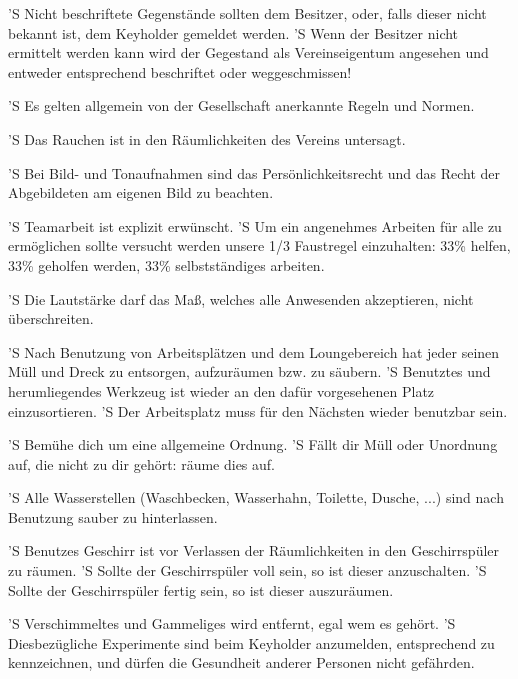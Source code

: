 \documentclass[a4paper,8pt]{scrreprt}
\begin{document}
\begin{contract}
'S Nicht beschriftete Gegenstände sollten dem Besitzer, oder, falls dieser
nicht bekannt ist, dem Keyholder gemeldet werden.
'S Wenn der Besitzer nicht ermittelt werden kann wird der Gegestand als
Vereinseigentum angesehen und entweder entsprechend beschriftet oder
weggeschmissen!


'S Es gelten allgemein von der Gesellschaft anerkannte Regeln und Normen.

'S Das Rauchen ist in den Räumlichkeiten des Vereins untersagt.

'S Bei Bild- und Tonaufnahmen sind das Persönlichkeitsrecht und das Recht der
Abgebildeten am eigenen Bild zu beachten.

'S Teamarbeit ist explizit erwünscht.
'S Um ein angenehmes Arbeiten für alle zu ermöglichen sollte versucht werden
unsere 1/3 Faustregel einzuhalten: 33\% helfen, 33\% geholfen werden, 33\%
selbstständiges arbeiten.

'S Die Lautstärke darf das Maß, welches alle Anwesenden akzeptieren, nicht
überschreiten.


'S Nach Benutzung von Arbeitsplätzen und dem Loungebereich hat jeder seinen
Müll und Dreck zu entsorgen, aufzuräumen bzw. zu säubern.
'S Benutztes und herumliegendes Werkzeug ist wieder an den dafür vorgesehenen
Platz einzusortieren.
'S Der Arbeitsplatz muss für den Nächsten wieder benutzbar sein.

'S Bemühe dich um eine allgemeine Ordnung.
'S Fällt dir Müll oder Unordnung auf, die nicht zu dir gehört: räume dies auf.

'S Alle Wasserstellen (Waschbecken, Wasserhahn, Toilette, Dusche, ...) sind
nach Benutzung sauber zu hinterlassen.

'S Benutzes Geschirr ist vor Verlassen der Räumlichkeiten in den
Geschirrspüler zu räumen.
'S Sollte der Geschirrspüler voll sein, so ist dieser anzuschalten.
'S Sollte der Geschirrspüler fertig sein, so ist dieser auszuräumen.

'S Verschimmeltes und Gammeliges wird entfernt, egal wem es gehört.
'S Diesbezügliche Experimente sind beim Keyholder anzumelden, entsprechend zu
kennzeichnen, und dürfen die Gesundheit anderer Personen nicht gefährden.

\end{contract}
\end{document}
